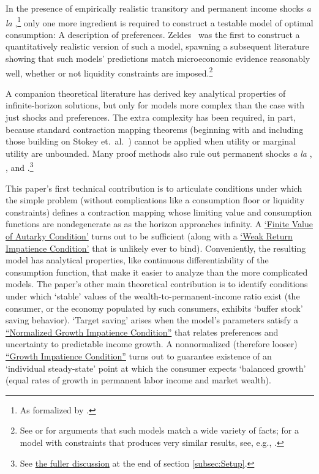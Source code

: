\documentclass[BufferStockTheory]{subfiles}
\begin{document}
\label{sec:intro}

In the presence of empirically realistic transitory and permanent income shocks \textit{a la} \cite{friedmanATheory},\footnote{As formalized by \cite{muthOptimal}.} only one more ingredient is required to construct a testable model of optimal consumption: A description of preferences.  Zeldes~\citeyearpar{zeldesStochastic} was the first to construct a quantitatively realistic version of such a model, spawning a subsequent literature showing that such models' predictions match microeconomic evidence reasonably well, whether or not liquidity constraints are imposed.\footnote{See \cite{carrollBSLCPIH} or \cite{gpLifeCycle} for arguments that such models match a wide variety of facts; for a model with constraints that produces very similar results, see, e.g., \cite{Cagetti}.}

A companion theoretical literature has derived key analytical properties of infinite-horizon solutions, but only for models more complex than the case with just shocks and preferences.  The extra complexity has been required, in part, because standard contraction mapping theorems (beginning with \cite{bellmanDynamicProgramming} and including those building on Stokey et.~al.~\citeyearpar{slpMethods}) cannot be applied when utility or marginal utility are unbounded.  Many proof methods also rule out permanent shocks \textit{a la} \cite{friedmanATheory}, \cite{muthOptimal}, and \cite{zeldesStochastic}.\footnote{See \hyperlink{DiffFromLit}{the fuller discussion} at the end of section \ref{subsec:Setup}.}

This paper's first technical contribution is to articulate conditions under which the simple problem (without complications like a consumption floor or liquidity constraints) defines a contraction mapping whose limiting value and consumption functions are nondegenerate as as the horizon approaches infinity.  A \hyperlink{FVAC}{`Finite Value of Autarky Condition'} turns out to be sufficient (along with a \hyperlink{WRIC}{`Weak Return Impatience Condition'} that is unlikely ever to bind).  Conveniently, the resulting model has analytical properties, like continuous differentiability of the consumption function, that make it easier to analyze than the more complicated models.  The paper's other main theoretical contribution is to identify conditions under which `stable' values of the wealth-to-permanent-income ratio exist (the consumer, or the economy populated by such consumers, exhibits `buffer stock' saving behavior).  `Target saving' arises when the model's parameters satisfy a \hyperlink{GICNrm}{``Normalized Growth Impatience Condition''} that relates preferences and uncertainty to predictable income growth.  A nonnormalized (therefore looser) \hyperlink{GIC}{``Growth Impatience Condition''} turns out to guarantee existence of an `individual steady-state' point at which the consumer expects `balanced growth' (equal rates of growth in permanent labor income and market wealth).  
\end{document}
